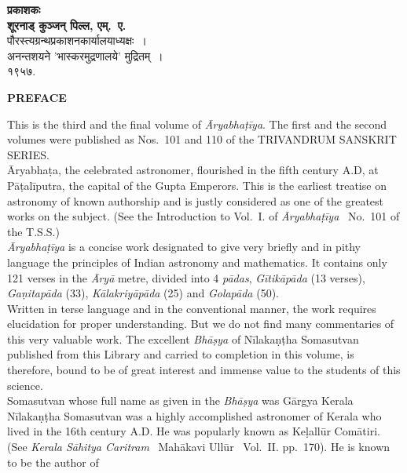 \documentclass[11pt, openany]{book}
\begin{document}
\begin{center}
\large\textbf{प्रकाशकः} \\
\vspace{4mm}
\textbf{शूरनाड् कुञ्जन् पिल्ल, एम्.~ए. }\\
\vspace{2mm}
\large{पौरस्त्यग्रन्थप्रकाशनकार्यालयाध्यक्षः~।} \\
\vspace{15mm}
\large{अनन्तशयने 'भास्करमुद्रणालये' मुद्रितम्~।} \\
\vspace{2mm}
१९५७. 
\end{center}
\thispagestyle{empty}
\newpage
\thispagestyle{empty}
\begin{center}
\large\textbf{\en PREFACE}
\end{center}
\vspace{0.2cm}
{\en This is the third and the final volume of \emph{Āryabhaṭīya}. The first and the second volumes were published as Nos.~101 and 110 of the TRIVANDRUM SANSKRIT SERIES.\\

Āryabhaṭa, the celebrated astronomer, flourished in the fifth century A.D, at Pāṭalīputra, the capital of the Gupta Emperors. This is the earliest treatise on
astronomy of known authorship and is justly considered as one of the greatest works on the subject. (See the Introduction to Vol.~I. of \emph{Āryabhaṭīya} \textendash\ No.~101 of the T.S.S.)\\

\emph{Āryabhaṭīya} is a concise work designated to give very briefly and in pithy language the principles of Indian astronomy and mathematics. It contains only 121 verses in the \emph{Āryā} metre, divided into 4 \emph{pādas}, \emph{Gītikāpāda} (13 verses), \emph{Gaṇitapāda} (33), \emph{Kālakriyāpāda} (25) and \emph{Golapāda} (50).\\

Written in terse language and in the conventional manner, the work requires elucidation for proper understanding. But we do not find many commentaries of this very valuable work. The excellent \emph{Bhāṣya} of Nīlakaṇṭha Somasutvan published from this Library and carried to completion in this volume, is therefore, bound to be of great interest and immense value to the students of this science.\\

Somasutvan whose full name as given in the \emph{Bhāṣya} was Gārgya Kerala Nīlakaṇṭha Somasutvan was a highly accomplished astronomer of Kerala who lived in the 16th century A.D. He was popularly known as Keḷallūr Comātiri. (See \emph{Kerala Sāhitya Caritram} \textendash\ Mahākavi Ullūr \textendash\ Vol.~II. pp.~170). He is known to be 
the author of}
\end{document}
